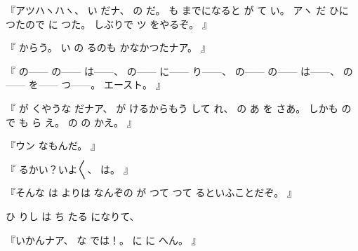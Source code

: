 %
『アツハヽハヽ、
%
い
だナ、
%
の
だ。
%
も
までになると
が
て
い。
%
アヽ
だ
ひに
つたので
に
つた。%
%
しぶりで
ツ
をやるぞ。
』

%
『
からう。
%
い
の
るのも
かなかつたナア。
』

%
『
の{---}{---}
の{---}{---}
は{---}{---}、
%
の{---}{---}
に{---}{---}
り{---}{---}、
%
の{---}{---}
の{---}{---}
は{---}{---}、
%
の{---}{---}
を{---}{---}
つ{---}{---}。
%
エースト。
』

%
『
が
くやうな
だナア、
%
が
けるからもう
して%
れ、
%
の
あ
を
さあ。
%
しかも
の
で
も
ら
え。
%
の
の
かえ。
』

%
『ウン
なもんだ。
』

%
『
るかい？いよ〳〵、
%
は。
』

%
『そんな
は
よりは
なんぞの%
が
つて
つて
るといふことだぞ。
』

%
ひ
りし
は
ち
たる
になりて、

%
『いかんナア、
%
な
では！。
%
に
に
へん。
』

